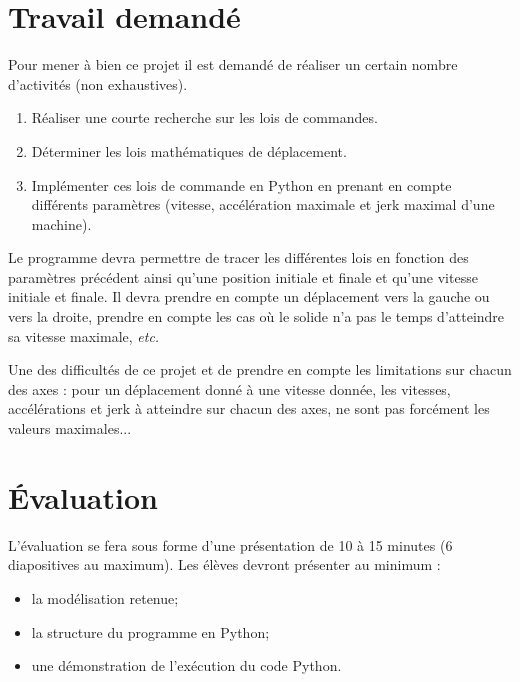 \documentclass[10pt]{article}
\newif\ifprof
\begin{document}
\section{Travail demandé}
Pour mener à bien ce projet il est demandé de réaliser un certain nombre d'activités (non exhaustives).
\begin{enumerate}
\item Réaliser une courte recherche sur les lois de commandes. 
\item Déterminer les lois mathématiques de déplacement.
\item Implémenter ces lois de commande en Python en prenant en compte différents paramètres (vitesse, accélération maximale et jerk maximal d'une machine).
\end{enumerate}

Le programme devra permettre de tracer les différentes lois en fonction des paramètres précédent ainsi qu'une position initiale et finale et qu'une vitesse initiale et finale. Il devra prendre en compte un déplacement vers la gauche ou vers la droite, prendre en compte les cas où le solide n'a pas le temps d'atteindre sa vitesse maximale, \textit{etc.}

Une des difficultés de ce projet et de prendre en compte les limitations sur chacun des axes : pour un déplacement donné à une vitesse donnée, les vitesses, accélérations et jerk à atteindre sur chacun des axes, ne sont pas forcément les valeurs maximales...


\section{Évaluation}
L'évaluation se fera sous forme d'une présentation de 10 à 15 minutes (6 diapositives au maximum). Les élèves devront présenter au minimum : 
\begin{itemize}
\item la modélisation retenue;
\item la structure du programme en Python;
\item une démonstration de l'exécution du code Python.
\end{itemize}


\ifprof
\section{Éléments de corrigé}


\else

\fi
\end{document}

